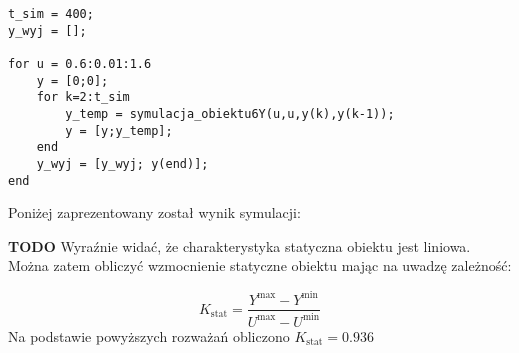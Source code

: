 \begin{lstlisting}[style=Matlab-editor]
t_sim = 400;
y_wyj = [];

for u = 0.6:0.01:1.6
    y = [0;0];
    for k=2:t_sim
        y_temp = symulacja_obiektu6Y(u,u,y(k),y(k-1));
        y = [y;y_temp];
    end
    y_wyj = [y_wyj; y(end)];
end
\end{lstlisting}

Poniżej zaprezentowany został wynik symulacji:
\par \textbf{TODO}
Wyraźnie widać, że charakterystyka statyczna obiektu jest liniowa. Można zatem obliczyć wzmocnienie statyczne obiektu mając na uwadzę zależność:

\begin{equation}
K_{\textrm{stat}} = \frac{Y^{\textrm{max}} - Y^{\textrm{min}}}{U^{\textrm{max}} - U^{\textrm{min}}}
\end{equation}
Na podstawie powyższych rozważań obliczono $K_{\textrm{stat}} = \num{0.936}$



